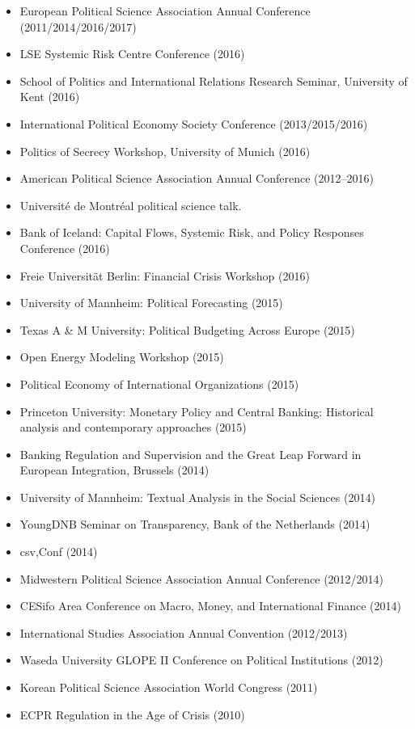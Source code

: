 \documentclass[a4paper]{article}
\begin{document}
{\begin{itemize}
    \item European Political Science Association Annual Conference (2011/2014/2016/2017)
    \item LSE Systemic Risk Centre Conference (2016)
    \item School of Politics and International Relations Research Seminar, University of Kent (2016)
    \item International Political Economy Society Conference (2013/2015/2016)
    \item Politics of Secrecy Workshop, University of Munich (2016)
    \item American Political Science Association Annual Conference (2012--2016)
    \item Universit\'{e} de Montr\'{e}al political science talk.
    \item Bank of Iceland: Capital Flows, Systemic Risk, and Policy Responses Conference (2016)
    \item Freie Universit\"{a}t Berlin: Financial Crisis Workshop (2016)
    \item University of Mannheim: Political Forecasting (2015)
    \item Texas A \& M University: Political Budgeting Across Europe (2015)
    \item Open Energy Modeling Workshop (2015)
    \item Political Economy of International Organizations (2015)
    \item Princeton University: Monetary Policy and Central Banking: Historical analysis and contemporary approaches (2015)
    \item Banking Regulation and Supervision and the Great Leap Forward in European Integration, Brussels (2014)
    \item University of Mannheim: Textual Analysis in the Social Sciences (2014)
    \item YoungDNB Seminar on Transparency, Bank of the Netherlands (2014)
    \item csv,Conf (2014)
    \item Midwestern Political Science Association Annual Conference (2012/2014)
    \item CESifo Area Conference on Macro, Money, and International Finance (2014)
    \item International Studies Association Annual Convention (2012/2013)
    \item Waseda University GLOPE II Conference on Political Institutions (2012)
    \item Korean Political Science Association World Congress (2011)
    \item ECPR Regulation in the Age of Crisis (2010)
\end{itemize}


}
\end{document}
